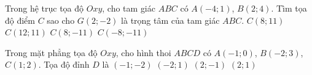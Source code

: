 \begin{ex}%
	Trong hệ trục tọa độ $Oxy$, cho tam giác $ABC$ có $A(-4;1)$, $B(2;4)$. Tìm tọa độ điểm $C$ sao cho $G(2;-2)$ là trọng tâm của tam giác $ABC$.
	\choice
	{$C(8;11)$}
	{$C(12;11)$}
	{\True $C(8;-11)$}
	{$C(-8;-11)$}
\end{ex}

\begin{ex}%
	Trong mặt phẳng tọa độ $Oxy$, cho hình thoi $ABCD$ có $A(-1;0)$, $B(-2;3)$, $C(1;2)$. Tọa độ đỉnh $D$ là
	\choice
	{$(-1;-2)$}
	{$(-2;1)$}
	{\True $(2;-1)$}
	{$(2;1)$}
\end{ex}


